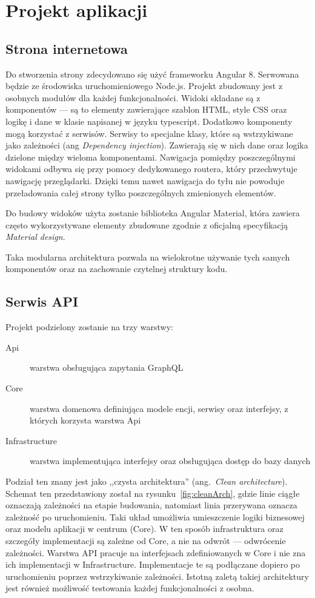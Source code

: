 
\chapter{Projekt aplikacji}
\section{Strona internetowa}
	Do stworzenia strony zdecydowano się użyć frameworku Angular 8.
	Serwowana będzie ze środowiska uruchomieniowego Node.js.
	Projekt zbudowany jest z osobnych modułów dla każdej funkcjonalności.
	Widoki składane są z komponentów --- są to elementy zawierające szablon HTML, style CSS oraz logikę i dane w klasie napisanej w języku typescript.
	Dodatkowo komponenty mogą korzystać z serwisów. Serwisy to specjalne klasy, które są wstrzykiwane jako zależności (ang \emph{Dependency injection}).
	Zawierają się w nich dane oraz logika dzielone między wieloma komponentami.
	Nawigacja pomiędzy poszczególnymi widokami odbywa się przy pomocy dedykowanego routera, który przechwytuje nawigację przeglądarki.
	Dzięki temu nawet nawigacja do tyłu nie powoduje przeładowania całej strony tylko poszczególnych zmienionych elementów.

	Do budowy widoków użyta zostanie biblioteka Angular Material,
	która zawiera często wykorzystywane elementy zbudowane zgodnie z oficjalną specyfikacją \emph{Material design}.

	Taka modularna architektura pozwala na wielokrotne używanie tych samych komponentów oraz na zachowanie czytelnej struktury kodu.

\section{Serwis API}
	Projekt podzielony zostanie na trzy warstwy:
	\begin{description}
		\item[Api] warstwa obsługująca zapytania GraphQL
		\item[Core] warstwa domenowa definiująca modele encji, serwisy oraz interfejsy, z których korzysta warstwa Api
		\item[Infrastructure] warstwa implementująca interfejsy oraz obsługująca dostęp do bazy danych
	\end{description}

	Podział ten znany jest jako ,,czysta architektura'' (ang.\ \emph{Clean architecture}).
	Schemat ten przedstawiony został na rysunku~\ref{fig:cleanArch},
	gdzie linie ciągłe oznaczają zależności na etapie budowania, natomiast linia przerywana oznacza zależność po uruchomieniu.
	Taki układ umożliwia umieszczenie logiki biznesowej oraz modelu aplikacji w centrum (Core).
	W ten sposób infrastruktura oraz szczegóły implementacji są zależne od Core, a nie na odwrót --- odwrócenie zależności.
	Warstwa API pracuje na interfejsach zdefiniowanych w Core i nie zna ich implementacji w Infrastructure.
	Implementacje te są podłączane dopiero po uruchomieniu poprzez wstrzykiwanie zależności.
	Istotną zaletą takiej architektury jest również możliwość testowania każdej funkcjonalności z osobna.

